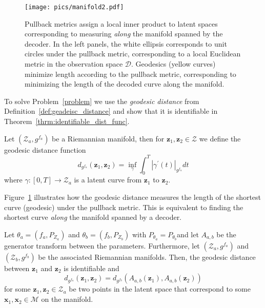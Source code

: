 \begin{figure}[t]
    \centering
    \texttt{[image: pics/manifold2.pdf]}
    \caption{Pullback metrics assign a local inner product to latent spaces corresponding to measuring \emph{along} the manifold spanned by the decoder. In the left panels, the white ellipsis corresponds to unit circles under the pullback metric, corresponding to a local Euclidean metric in the observation space $\mathcal{D}$. Geodesics (yellow curves) minimize length according to the pullback metric, corresponding to minimizing the length of the decoded curve along the manifold.}
    \label{fig:manifold2}
\end{figure}
To solve Problem~\ref{problem} we use the \emph{geodesic distance} from Definition~\ref{def:geadeisc_distance} and show that it is identifiable in Theorem~\ref{thrm:identifiable_dist_func}.
\begin{definition}
    \label{def:geadeisc_distance}
    Let $(\mathcal{Z}_a,g^{f_a})$ be a Riemannian manifold, then for $\mathbf{z}_1,\mathbf{z}_2 \in \mathcal{Z}$ we define the geodesic distance function
    \begin{equation}
        \label{eq:geodesic_dist_def}
        d_{g^{f_a}}(\mathbf{z}_1,\mathbf{z}_2)= \inf_{\gamma} \int_0^T | \gamma^{\prime}(t) |_{g^{f_a}} dt
    \end{equation}
    where $\gamma:[0,T]\rightarrow \mathcal{Z}_a$ is a latent curve from $\mathbf{z}_1$ to $\mathbf{z}_2$. %
\end{definition}
Figure~\ref{fig:manifold2} illustrates how the geodesic distance measures the length of the shortest curve (geodesic) under the pullback metric. This is equivalent to finding the shortest curve \emph{along} the manifold spanned by a decoder.

\begin{theorem}
    \label{thrm:identifiable_dist_func}
     Let $\theta_a=\left(f_a, P_{Z_a}\right)$ and $\theta_b=\left(f_b, P_{Z_b}\right)$ with $P_{\theta_a}=P_{\theta_b}$and let $A_{a, b}$ be the generator transform between the parameters. Furthermore, let $(\mathcal{Z}_a, g^{f_a})$ and $(\mathcal{Z}_b,g^{f_b})$ be the associated Riemannian manifolds. Then, the geodesic distance between $\mathbf{z}_1$ and $\mathbf{z}_2$ is identifiable and
    \begin{equation}
        \label{eq:geodesic_dist}
        d_{g^{f_a}}(\mathbf{z}_1,\mathbf{z}_2)= d_{g^{f_b}}(A_{a, b}(\mathbf{z}_1),A_{a, b}(\mathbf{z}_2))
    \end{equation}
for some $\mathbf{z}_1,\mathbf{z}_2 \in \mathcal{Z}_a$ be two points in the latent space that correspond to some $\mathbf{x}_1,\mathbf{x}_2 \in \mathcal{M}$ on the manifold.
\end{theorem}

